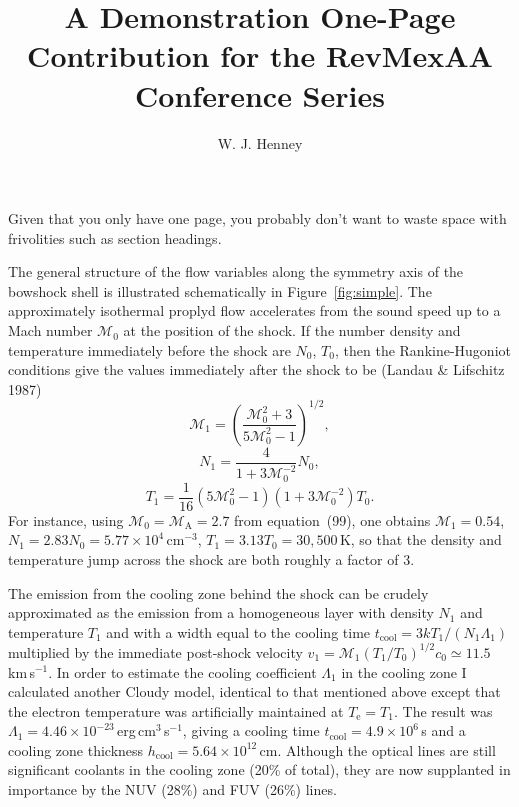 \documentclass[preprint,proceedings]{rmaa}
\title{A Demonstration One-Page Contribution for the RevMexAA Conference Series}
\author{
  W. J. Henney\altaffilmark{1,2,3}}
\newcommand{\Sub}[1]{_\mathrm{#1}}
\begin{document}
\maketitle 



Given that you only have one page, you probably don't want to waste
space with frivolities such as section headings.  

The general structure of the flow variables along the symmetry axis of
the bowshock shell is illustrated schematically in
Figure~\ref{fig:simple}.  The approximately isothermal proplyd flow
accelerates from the sound speed up to a Mach number $\mathcal{M}_0$
at the position of the shock. If the number density and temperature
immediately before the shock are $N_0$, $T_0$, then the
Rankine-Hugoniot conditions give the values immediately after
the shock to be (Landau \& Lifschitz 1987)
\begin{equation}
  \label{eq:mjump}
  \mathcal{M}_1 = \left( \frac{ \mathcal{M}_0^2 + 3 } { 5
      \mathcal{M}_0^2 - 1 } \right)^{1/2} , 
\end{equation}
\begin{equation}
  \label{eq:njump}
  N_1 = \frac{ 4 } { 1 + 3 \mathcal{M}_0^{-2} } N_0 , 
\end{equation}
\begin{equation}
  \label{eq:tjump}
  T_1 = \frac{1}{16} \left( 5 \mathcal{M}_0^2 - 1 \right) 
  \left( 1 + 3 \mathcal{M}_0^{-2} \right) T_0 .
\end{equation}
For instance, using $\mathcal{M}_0 = \mathcal{M}\Sub{A} = 2.7$ from
equation~(99), one obtains $\mathcal{M}_1 = 0.54$,
$N_1 = 2.83 N_0 = 5.77 \times 10^4$\,cm$^{-3}$, $T_1 = 3.13 T_0 =
30,500$\,K, so that the density and temperature jump across the shock
are both roughly a factor of 3.

The emission from the cooling zone behind the shock can be crudely
approximated as the emission from a homogeneous layer with density
$N_1$ and temperature $T_1$ and with a width equal to the cooling time
$t\Sub{cool} = 3 k T_1 / \left( N_1 \Lambda_1 \right)$ multiplied by
the immediate post-shock velocity $v_1 = \mathcal{M}_1 (T_1/T_0)^{1/2}
c_0 \simeq 11.5$\,km\,s$^{-1}$. In order to estimate the cooling
coefficient $\Lambda_1$ in the cooling zone I calculated another
Cloudy model, identical to that mentioned above except that the
electron temperature was artificially maintained at $T\Sub{e} = T_1$.
The result was $\Lambda_1 = 4.46 \times
10^{-23}$\,erg\,cm$^{3}$\,s$^{-1}$, giving a cooling time $t\Sub{cool} =
4.9 \times 10^6$\,s and a cooling zone thickness $h\Sub{cool} = 5.64
\times 10^{12}$\,cm. Although the  optical lines are still
significant coolants in the cooling zone (20\% of total), they are now
supplanted in importance by the  NUV (28\%) and FUV (26\%)
lines.
\end{document}
